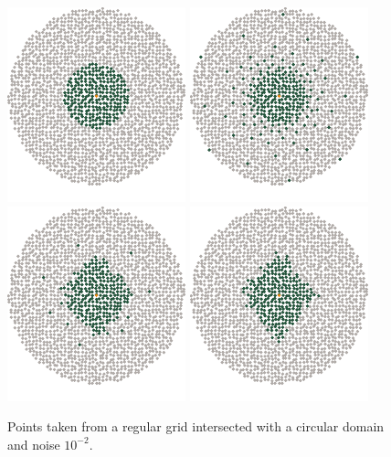 \documentclass[review,supplement,onefignum,onetabnum]{siamonline220329}
\begin{document}
\begin{figure}[H]
  \centering
  \includegraphics{figures/precompiled/sphere_1e-2/points_1.pdf}%
  \quad
  \includegraphics{figures/precompiled/sphere_1e-2/points_2.pdf}%
  \quad
  \includegraphics{figures/precompiled/sphere_1e-2/points_3.pdf}%
  \quad
  \includegraphics{figures/precompiled/sphere_1e-2/points_4.pdf}%
  \caption{%
    Points taken from a regular grid intersected
    with a circular domain and noise \( 10^{-2} \).
  }
\end{figure}
\end{document}
